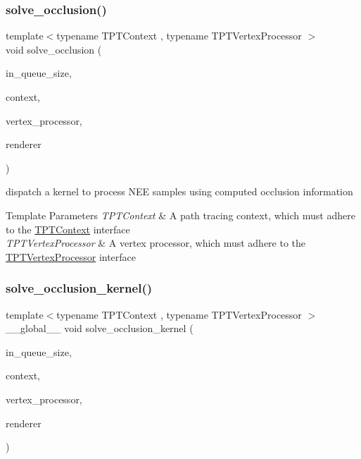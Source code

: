 \subsubsection{\texorpdfstring{solve\+\_\+occlusion()}{solve\_occlusion()}}
{\footnotesize\ttfamily template$<$typename T\+P\+T\+Context , typename T\+P\+T\+Vertex\+Processor $>$ \\
void solve\+\_\+occlusion (\begin{DoxyParamCaption}\item[{const uint32}]{in\+\_\+queue\+\_\+size,  }\item[{T\+P\+T\+Context}]{context,  }\item[{T\+P\+T\+Vertex\+Processor}]{vertex\+\_\+processor,  }\item[{\hyperlink{struct_rendering_context_view}{Rendering\+Context\+View}}]{renderer }\end{DoxyParamCaption})}

dispatch a kernel to process N\+EE samples using computed occlusion information


\begin{DoxyTemplParams}{Template Parameters}
{\em T\+P\+T\+Context} & A path tracing context, which must adhere to the \hyperlink{_p_t_lib_page_TPTContext}{T\+P\+T\+Context} interface \\
\hline
{\em T\+P\+T\+Vertex\+Processor} & A vertex processor, which must adhere to the \hyperlink{_p_t_lib_page_TPTVertexProcessor}{T\+P\+T\+Vertex\+Processor} interface \\
\hline
\end{DoxyTemplParams}
\mbox{\label{group___p_t_lib_gafdd73db6764901e4b3f75b55362acf8b}} 
\subsubsection{\texorpdfstring{solve\+\_\+occlusion\+\_\+kernel()}{solve\_occlusion\_kernel()}}
{\footnotesize\ttfamily template$<$typename T\+P\+T\+Context , typename T\+P\+T\+Vertex\+Processor $>$ \\
\+\_\+\+\_\+global\+\_\+\+\_\+ void solve\+\_\+occlusion\+\_\+kernel (\begin{DoxyParamCaption}\item[{const uint32}]{in\+\_\+queue\+\_\+size,  }\item[{T\+P\+T\+Context}]{context,  }\item[{T\+P\+T\+Vertex\+Processor}]{vertex\+\_\+processor,  }\item[{\hyperlink{struct_rendering_context_view}{Rendering\+Context\+View}}]{renderer }\end{DoxyParamCaption})}


